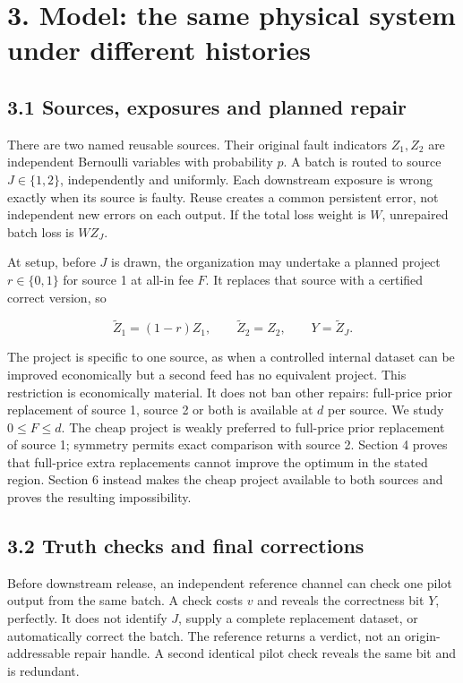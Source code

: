 \documentclass[
  11pt,
  a4paper,
]{article}
\begin{document}
\section{3. Model: the same physical system under different
histories}\label{model-the-same-physical-system-under-different-histories}

\subsection{3.1 Sources, exposures and planned
repair}\label{sources-exposures-and-planned-repair}

There are two named reusable sources. Their original fault indicators
\(Z_1,Z_2\) are independent Bernoulli variables with probability \(p\).
A batch is routed to source \(J\in\{1,2\}\), independently and
uniformly. Each downstream exposure is wrong exactly when its source is
faulty. Reuse creates a common persistent error, not independent new
errors on each output. If the total loss weight is \(W\), unrepaired
batch loss is \(W Z_J\).

At setup, before \(J\) is drawn, the organization may undertake a
planned project \(r\in\{0,1\}\) for source 1 at all-in fee \(F\). It
replaces that source with a certified correct version, so

\[\widetilde Z_1=(1-r)Z_1,\qquad \widetilde Z_2=Z_2,\qquad Y=\widetilde Z_J.\tag{1}\]

The project is specific to one source, as when a controlled internal
dataset can be improved economically but a second feed has no equivalent
project. This restriction is economically material. It does not ban
other repairs: full-price prior replacement of source 1, source 2 or
both is available at \(d\) per source. We study \(0\leq F\leq d\). The
cheap project is weakly preferred to full-price prior replacement of
source 1; symmetry permits exact comparison with source 2. Section 4
proves that full-price extra replacements cannot improve the optimum in
the stated region. Section 6 instead makes the cheap project available
to both sources and proves the resulting impossibility.

\subsection{3.2 Truth checks and final
corrections}\label{truth-checks-and-final-corrections}

Before downstream release, an independent reference channel can check
one pilot output from the same batch. A check costs \(v\) and reveals
the correctness bit \(Y\), perfectly. It does not identify \(J\), supply
a complete replacement dataset, or automatically correct the batch. The
reference returns a verdict, not an origin-addressable repair handle. A
second identical pilot check reveals the same bit and is redundant.
\end{document}
